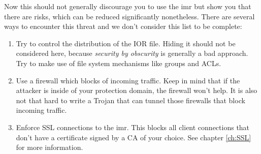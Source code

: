 Now this should  not generally discourage you to use  the imr but show
you  that   there  are  risks,  which  can   be  reduced  significantly
nonetheless. There  are several ways  to encounter this threat  and we
don't consider this list to be complete:
\begin{enumerate}
        \item Try to control the distribution of the IOR file. Hiding
          it should not be considered here, because {\it security by
            obscurity} is generally a bad approach. Try to make use of
          file system mechanisms like groups and ACLs.
          \item Use a firewall which blocks of incoming traffic. Keep
            in mind that if the attacker is inside of your protection
            domain, the firewall won't help. It is also not that hard
            to write a Trojan that can tunnel those firewalls that
            block incoming traffic.
          \item Enforce SSL connections to the imr. This blocks all
            client connections that don't have a certificate signed by
            a CA of your choice. See chapter \ref{ch:SSL} for more
            information.
\end{enumerate}


